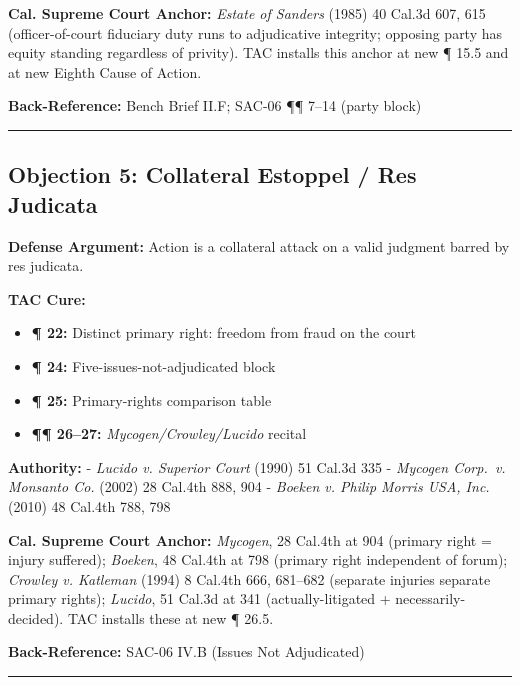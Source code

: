 \textbf{Cal. Supreme Court Anchor:} \emph{Estate of Sanders} (1985) 40 Cal.3d 607, 615 (officer-of-court fiduciary duty runs to adjudicative integrity; opposing party has equity standing regardless of privity). TAC installs this anchor at new ¶ 15.5 and at new Eighth Cause of Action.

\textbf{Back-Reference:} Bench Brief \textsection{}II.F; SAC-06 ¶¶ 7--14 (party block)

\begin{center}\rule{0.5\linewidth}{0.5pt}\end{center}

\subsection{Objection 5: Collateral Estoppel / Res Judicata}\label{objection-5-collateral-estoppel-res-judicata}

\textbf{Defense Argument:} Action is a collateral attack on a valid judgment barred by res judicata.

\textbf{TAC Cure:}

\begin{itemize}
\tightlist
\item
  \textbf{¶ 22:} Distinct primary right: freedom from fraud on the court
\item
  \textbf{¶ 24:} Five-issues-not-adjudicated block
\item
  \textbf{¶ 25:} Primary-rights comparison table
\item
  \textbf{¶¶ 26--27:} \emph{Mycogen/Crowley/Lucido} recital
\end{itemize}

\textbf{Authority:} - \emph{Lucido v. Superior Court} (1990) 51 Cal.3d 335 - \emph{Mycogen Corp.~v. Monsanto Co.} (2002) 28 Cal.4th 888, 904 - \emph{Boeken v. Philip Morris USA, Inc.} (2010) 48 Cal.4th 788, 798

\textbf{Cal. Supreme Court Anchor:} \emph{Mycogen}, 28 Cal.4th at 904 (primary right = injury suffered); \emph{Boeken}, 48 Cal.4th at 798 (primary right independent of forum); \emph{Crowley v. Katleman} (1994) 8 Cal.4th 666, 681--682 (separate injuries {\textrightarrow{}} separate primary rights); \emph{Lucido}, 51 Cal.3d at 341 (actually-litigated + necessarily-decided). TAC installs these at new ¶ 26.5.

\textbf{Back-Reference:} SAC-06 \textsection{}IV.B (Issues Not Adjudicated)

\begin{center}\rule{0.5\linewidth}{0.5pt}\end{center}

